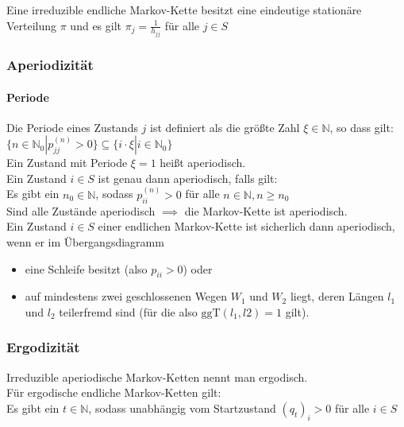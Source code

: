 \documentclass[a4paper,9pt]{extarticle}
\begin{document}
Eine irreduzible endliche Markov-Kette besitzt eine eindeutige stationäre Verteilung $\pi$ und es gilt $\pi_j = \frac 1 {h_{jj}}$ für alle $j \in S$

\subsubsection*{Aperiodizität}
\paragraph*{Periode}
Die Periode eines Zustands $j$ ist definiert als die größte Zahl $\xi \in \mathbb{N}$, so dass gilt: \\
$\{n \in \mathbb{N}_0 | p_{jj}^{(n)} > 0\} \subseteq \{i ⋅ \xi | i \in \mathbb{N}_0\}$ \\

Ein Zustand mit Periode $\xi = 1$ heißt aperiodisch. \\

Ein Zustand $i \in S$ ist genau dann aperiodisch, falls gilt: \\
Es gibt ein $n_0 \in \mathbb{N}$, sodass $p_{ii}^{(n)} > 0$ für alle $n \in \mathbb{N}, n ≥ n_0$ \\

Sind alle Zustände aperiodisch $\implies$ die Markov-Kette ist aperiodisch. \\

Ein Zustand $i \in S$ einer endlichen Markov-Kette ist sicherlich dann aperiodisch, wenn er im Übergangsdiagramm
\begin{itemize}
	\item eine Schleife besitzt (also $p_{ii} > 0$) oder
	\item auf mindestens zwei geschlossenen Wegen $W_1$ und $W_2$ liegt, deren Längen $l_1$ und $l_2$ teilerfremd sind (für die also $\text{ggT}(l_1,l2) = 1$ gilt).
\end{itemize}

\subsubsection*{Ergodizität}
Irreduzible aperiodische Markov-Ketten nennt man ergodisch. \\

Für ergodische endliche Markov-Ketten gilt: \\
Es gibt ein $t \in \mathbb{N}$, sodass unabhängig vom Startzustand $(q_t)_i > 0$ für alle $i \in S$ \\
\end{document}
